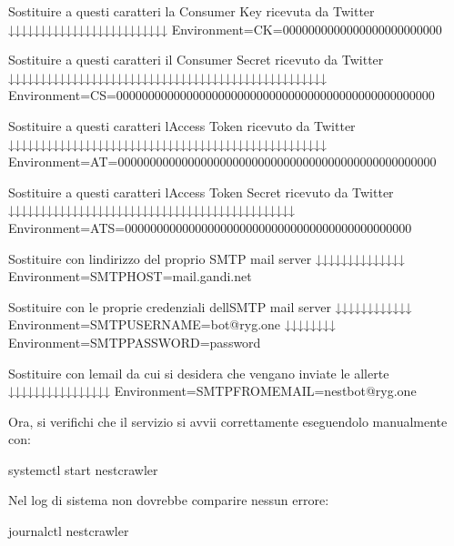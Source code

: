 \documentclass[letterpaper,10pt,italian]{sphinxmanual}
\begin{document}
\begin{sphinxVerbatim}[commandchars=\\\{\}]
[Service]

\PYGZsh{} Sostituire a questi caratteri la Consumer Key ricevuta da Twitter
\PYGZsh{}               ↓↓↓↓↓↓↓↓↓↓↓↓↓↓↓↓↓↓↓↓↓↓↓↓↓
Environment=C\PYGZus{}K=0000000000000000000000000


\PYGZsh{} Sostituire a questi caratteri il Consumer Secret ricevuto da Twitter
\PYGZsh{}               ↓↓↓↓↓↓↓↓↓↓↓↓↓↓↓↓↓↓↓↓↓↓↓↓↓↓↓↓↓↓↓↓↓↓↓↓↓↓↓↓↓↓↓↓↓↓↓↓↓↓
Environment=C\PYGZus{}S=00000000000000000000000000000000000000000000000000

\PYGZsh{} Sostituire a questi caratteri l\PYGZsq{}Access Token ricevuto da Twitter
\PYGZsh{}               ↓↓↓↓↓↓↓↓↓↓↓↓↓↓↓↓↓↓↓↓↓↓↓↓↓↓↓↓↓↓↓↓↓↓↓↓↓↓↓↓↓↓↓↓↓↓↓↓↓↓
Environment=A\PYGZus{}T=00000000000000000000000000000000000000000000000000

\PYGZsh{} Sostituire a questi caratteri l\PYGZsq{}Access Token Secret ricevuto da Twitter
\PYGZsh{}                 ↓↓↓↓↓↓↓↓↓↓↓↓↓↓↓↓↓↓↓↓↓↓↓↓↓↓↓↓↓↓↓↓↓↓↓↓↓↓↓↓↓↓↓↓↓
Environment=A\PYGZus{}T\PYGZus{}S=000000000000000000000000000000000000000000000

\PYGZsh{} Sostituire con l\PYGZsq{}indirizzo del proprio SMTP mail server
\PYGZsh{}                     ↓↓↓↓↓↓↓↓↓↓↓↓↓↓
Environment=SMTP\PYGZus{}HOST=mail.gandi.net

\PYGZsh{} Sostituire con le proprie credenziali dell\PYGZsq{}SMTP mail server
\PYGZsh{}                         ↓↓↓↓↓↓↓↓↓↓↓↓
Environment=SMTP\PYGZus{}USERNAME=bot@ryg.one
\PYGZsh{}                         ↓↓↓↓↓↓↓↓
Environment=SMTP\PYGZus{}PASSWORD=password

\PYGZsh{} Sostituire con l\PYGZsq{}email da cui si desidera che vengano inviate le allerte
\PYGZsh{}                           ↓↓↓↓↓↓↓↓↓↓↓↓↓↓↓↓
Environment=SMTP\PYGZus{}FROM\PYGZus{}EMAIL=nest\PYGZhy{}bot@ryg.one
\end{sphinxVerbatim}

\sphinxAtStartPar
Ora, si verifichi che il servizio si avvii correttamente eseguendolo manualmente con:

\begin{sphinxVerbatim}[commandchars=\\\{\}]
systemctl start nest\PYGZhy{}crawler
\end{sphinxVerbatim}

\sphinxAtStartPar
Nel log di sistema non dovrebbe comparire nessun errore:

\begin{sphinxVerbatim}[commandchars=\\\{\}]
journalctl nest\PYGZhy{}crawler
\end{sphinxVerbatim}
\end{document}
